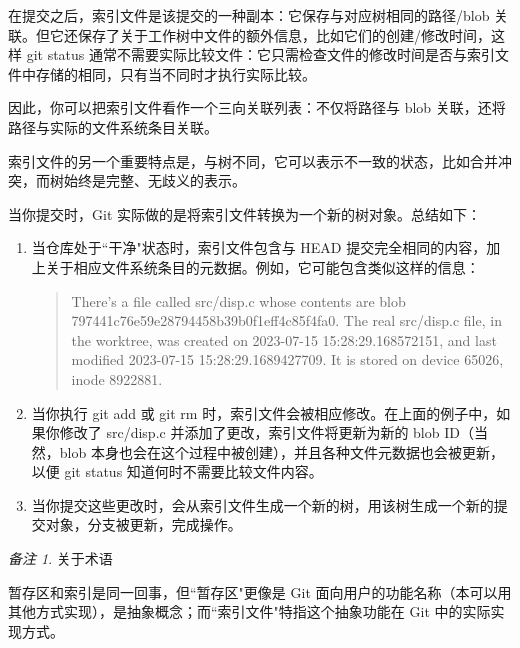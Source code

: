 \documentclass{ctexart}
\theoremstyle{remark}
\newtheorem*{remark}{备注}
\theoremstyle{warningstyle}
\theoremstyle{warningstyle}
\begin{document}
在提交之后，索引文件是该提交的一种副本：它保存与对应树相同的路径/blob 关联。但它还保存了关于工作树中文件的额外信息，比如它们的创建/修改时间，这样 git status 通常不需要实际比较文件：它只需检查文件的修改时间是否与索引文件中存储的相同，只有当不同时才执行实际比较。

因此，你可以把索引文件看作一个三向关联列表：不仅将路径与 blob 关联，还将路径与实际的文件系统条目关联。

索引文件的另一个重要特点是，与树不同，它可以表示不一致的状态，比如合并冲突，而树始终是完整、无歧义的表示。

当你提交时，Git 实际做的是将索引文件转换为一个新的树对象。总结如下：
\begin{enumerate}
    \item 当仓库处于``干净"状态时，索引文件包含与 HEAD 提交完全相同的内容，加上关于相应文件系统条目的元数据。例如，它可能包含类似这样的信息：
      \begin{quote}
There’s a file called src/disp.c whose contents are blob 797441c76e59e28794458b39b0f1eff4c85f4fa0. The real src/disp.c file, in the worktree, was created on 2023-07-15 15:28:29.168572151, and last modified 2023-07-15 15:28:29.1689427709. It is stored on device 65026, inode 8922881.
      \end{quote}
    \item 当你执行 git add 或 git rm 时，索引文件会被相应修改。在上面的例子中，如果你修改了 src/disp.c 并添加了更改，索引文件将更新为新的 blob ID（当然，blob 本身也会在这个过程中被创建），并且各种文件元数据也会被更新，以便 git status 知道何时不需要比较文件内容。
    \item 当你提交这些更改时，会从索引文件生成一个新的树，用该树生成一个新的提交对象，分支被更新，完成操作。
\end{enumerate}
    \begin{remark}关于术语

    暂存区和索引是同一回事，但``暂存区"更像是 Git 面向用户的功能名称（本可以用其他方式实现），是抽象概念；而``索引文件"特指这个抽象功能在 Git 中的实际实现方式。\end{remark}
\end{document}
